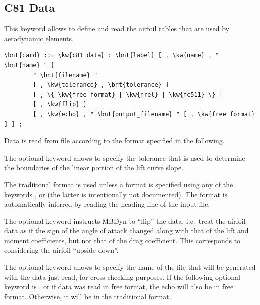 \subsection{C81 Data}\label{sec:C81-DATA}
This keyword allows to define and read the  
airfoil tables that are used by aerodynamic elements.
\begin{Verbatim}[commandchars=\\\{\}]
    \bnt{card} ::= \kw{c81 data} : \bnt{label} [ , \kw{name} , " \bnt{name} " ]
        " \bnt{filename} "
        [ , \kw{tolerance} , \bnt{tolerance} ]
        [ , \{ \kw{free format} | \kw{nrel} | \kw{fc511} \} ]
        [ , \kw{flip} ]
        [ , \kw{echo} , " \bnt{output_filename} " [ , \kw{free format} ] ] ;
\end{Verbatim}
Data is read from file  according to the format specified
in the following.

The optional keyword  allows to specify the tolerance
that is used to determine the boundaries of the linear portion
of the lift curve slope.

The traditional format is used unless a format is specified using any
of the keywords ,  or 
(the latter is intentionally not documented).
The format is automatically inferred by reading the heading line
of the input file.

The optional keyword  instructs MBDyn to ``flip'' the data,
i.e.\ treat the airfoil data as if the sign of the angle of attack
changed along with that of the lift and moment coefficients,
but not that of the drag coefficient.
This corresponds to considering the airfoil ``upside down''.

The optional keyword  allows to specify the name of the file
that will be generated with the data just read, for cross-checking purposes.
If the following optional keyword is , or if data was read
in free format, the echo will also be in free format.
Otherwise, it will be in the traditional format.

